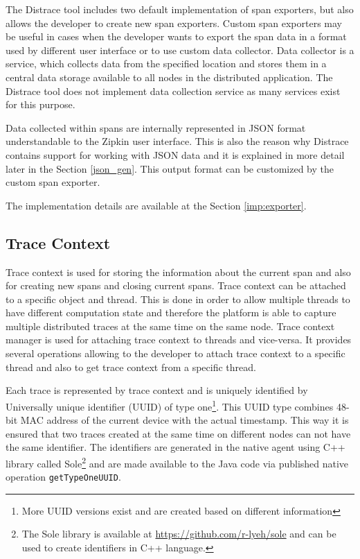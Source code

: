 The Distrace tool includes two default implementation of span exporters, but also allows the developer to create new span exporters. Custom span exporters may be useful in cases when the developer wants to export the span data in a format used by different user interface or to use custom data collector. Data collector is a service, which collects data from the specified location and stores them in a central data storage available to all nodes in the distributed application. The Distrace tool does not implement data collection service as many services exist for this purpose. 

Data collected within spans are internally represented in JSON format understandable to the Zipkin user interface. This is also the reason why Distrace contains support for working with JSON data and it is explained in more detail later in the Section \ref{json_gen}. This output format can be customized by the custom span exporter.

The implementation details are available at the Section \ref{imp:exporter}.
\subsection{Trace Context}
Trace context is used for storing the information about the current span and also for creating new spans and closing current spans. Trace context can be attached to a specific object and thread. This is done in order to allow multiple threads to have different computation state and therefore the platform is able to capture multiple distributed traces at the same time on the same node. Trace context manager is used for attaching trace context to threads and vice-versa. It provides several operations allowing to the developer to attach trace context to a specific thread and also to get trace context from a specific thread.

Each trace is represented by trace context and is uniquely identified by Universally unique identifier (UUID) of type one\footnote{More UUID versions exist and are created based on different information}. This UUID type combines 48-bit MAC address of the current device with the actual timestamp. This way it is ensured that two traces created at the same time on different nodes can not have the same identifier. The identifiers are generated in the native agent using C++ library called Sole\footnote{The Sole library is available at \url{https://github.com/r-lyeh/sole} and can be used to create identifiers in C++ language.} and are made available to the Java code via published native operation \texttt{getTypeOneUUID}.

